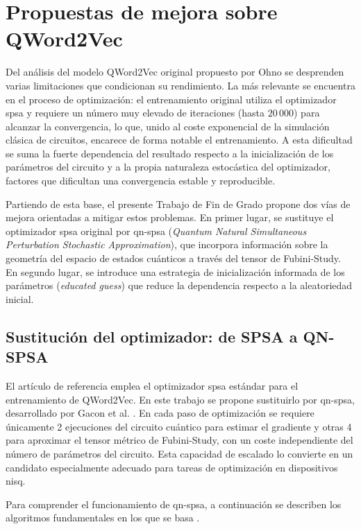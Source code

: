 \section{Propuestas de mejora sobre QWord2Vec}
\label{sec:propuestas_mejora}

Del análisis del modelo QWord2Vec original propuesto por Ohno \cite{ohno_qword2vec_2025} se desprenden varias limitaciones que condicionan su rendimiento. La más relevante se encuentra en el proceso de optimización: el entrenamiento original utiliza el optimizador \gls{spsa} y requiere un número muy elevado de iteraciones (hasta $20\,000$) para alcanzar la convergencia, lo que, unido al coste exponencial de la simulación clásica de circuitos, encarece de forma notable el entrenamiento. A esta dificultad se suma la fuerte dependencia del resultado respecto a la inicialización de los parámetros del circuito y a la propia naturaleza estocástica del optimizador, factores que dificultan una convergencia estable y reproducible.

Partiendo de esta base, el presente Trabajo de Fin de Grado propone dos vías de mejora orientadas a mitigar estos problemas. En primer lugar, se sustituye el optimizador \gls{spsa} original por \gls{qn-spsa} (\textit{Quantum Natural Simultaneous Perturbation Stochastic Approximation}), que incorpora información sobre la geometría del espacio de estados cuánticos a través del tensor de Fubini-Study. En segundo lugar, se introduce una estrategia de inicialización informada de los parámetros (\textit{educated guess}) que reduce la dependencia respecto a la aleatoriedad inicial.


\subsection{Sustitución del optimizador: de SPSA a QN-SPSA}

El artículo de referencia \cite{ohno_qword2vec_2025} emplea el optimizador \gls{spsa} estándar para el entrenamiento de QWord2Vec. En este trabajo se propone sustituirlo por \gls{qn-spsa}, desarrollado por Gacon et al. \cite{gacon_qnspsa_2021}. En cada paso de optimización se requiere únicamente 2 ejecuciones del circuito cuántico para estimar el gradiente y otras 4 para aproximar el tensor métrico de Fubini-Study, con un coste independiente del número de parámetros del circuito. Esta capacidad de escalado lo convierte en un candidato especialmente adecuado para tareas de optimización en dispositivos \gls{nisq}.

Para comprender el funcionamiento de \gls{qn-spsa}, a continuación se describen los algoritmos fundamentales en los que se basa \cite{duan_qnspsa_pennylane_2022}.


